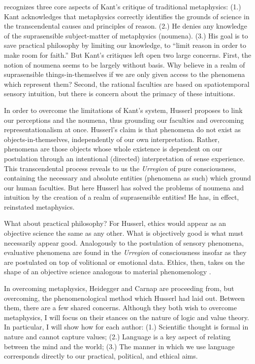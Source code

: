 \documentclass[leqno, 12pt]{turabian-researchpaper}
\begin{document}
	\autocite{stone2017} recognizes three core aspects of Kant's critique of traditional
	metaphysics: (1.) Kant acknowledges that metaphysics correctly identifies the
	grounds of science in the transcendental causes and principles of reason. (2.)
	He denies any knowledge of the suprasensible subject-matter of metaphysics (noumena).
	(3.) His goal is to save practical philosophy by limiting our knowledge, to \enquote{limit reason in order to make room for faith.}
	But Kant's critiques left open two large concerns. First, the notion of
	noumena seems to be largely without basis. Why believe in a realm of suprasensible
	things-in-themselves if we are only given access to the phenomena which represent
	them? Second, the rational faculties are based on spatiotemporal sensory intuition,
	but there is concern about the primacy of these intuitions.

	In order to overcome the limitations of Kant's system, Husserl proposes to link
	our perceptions and the noumena, thus grounding our faculties and overcoming
	representationalism at once. Husserl's claim is that phenomena do not exist as
	objects-in-themselves, independently of our own interpretation. Rather,
	phenomena are those objects whose whole existence is dependent on our
	postulation through an intentional (directed) interpretation of sense
	experience. This transcendental process reveals to us the \textit{Urregion} of
	pure consciousness, containing the necessary and absolute entities (phenomena
	as such) which ground our human faculties. But here Husserl has solved the
	problems of noumena and intuition by the creation of a realm of suprasensible
	entities! He has, in effect, reinstated metaphysics. \autocite[4f]{stone2017}

	What about practical philosophy? For Husserl, ethics would appear as an objective
	science the same as any other. What is objectively good is what must
	necessarily appear good. Analogously to the postulation of sensory phenomena,
	evaluative phenomena are found in the \textit{Urregion} of consciousness insofar
	as they are postulated on top of volitional or emotional data. Ethics, then,
	takes on the shape of an objective science analogous to material phenomenology
	\autocite[5]{stone2017}.

	In overcoming metaphysics, Heidegger and Carnap are proceeding from, but
	overcoming, the phenomenological method which Husserl had laid out. Between
	them, there are a few shared concerns. Although they both wish to overcome
	metaphysics, I will focus on their stances on the nature of logic and value theory.
	In particular, I will show how for each author: (1.) Scientific thought is
	formal in nature and cannot capture values; (2.) Language is a key aspect of relating
	between the mind and the world; (3.) The manner in which we use language
	corresponds directly to our practical, political, and ethical aims.
\end{document}
